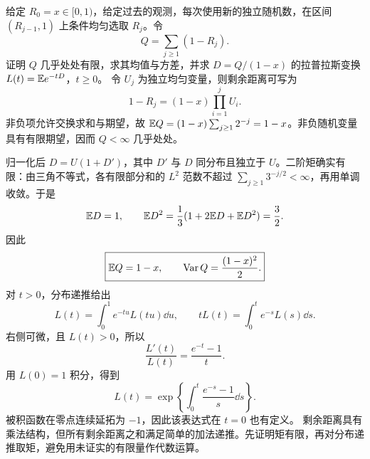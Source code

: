 给定 $R_0=x\in[0,1)$，给定过去的观测，每次使用新的独立随机数，在区间 $(R_{j-1},1)$ 上条件均匀选取 $R_j$。令
\[
Q=\sum_{j\ge1}(1-R_j).
\]
证明 $Q$ 几乎处处有限，求其均值与方差，并求 $D=Q/(1-x)$ 的拉普拉斯变换 $L(t)=\mathbb{E} e^{-tD}$，$t\ge0$。
\solution 令 $U_j$ 为独立均匀变量，则剩余距离可写为
\[
1-R_j=(1-x)\prod_{i=1}^jU_i.
\]
非负项允许交换求和与期望，故 $\mathbb{E} Q=(1-x)\sum_{j\ge1}2^{-j}=1-x$。非负随机变量具有有限期望，因而 $Q<\infty$ 几乎处处。

归一化后 $D=U(1+D')$，其中 $D'$ 与 $D$ 同分布且独立于 $U$。二阶矩确实有限：由三角不等式，各有限部分和的 $L^2$ 范数不超过 $\sum_{j\ge1}3^{-j/2}<\infty$，再用单调收敛。于是
\[
\mathbb{E} D=1,\qquad
\mathbb{E} D^2=\frac13(1+2\mathbb{E} D+\mathbb{E} D^2)=\frac32.
\]
因此
\[
\boxed{\mathbb{E} Q=1-x,\qquad \operatorname{Var} Q=\frac{(1-x)^2}{2}.}
\]
对 $t>0$，分布递推给出
\[
L(t)=\int_0^1e^{-tu}L(tu)\dd u,
\qquad tL(t)=\int_0^te^{-s}L(s)\dd s.
\]
右侧可微，且 $L(t)>0$，所以
\[
\frac{L'(t)}{L(t)}=\frac{e^{-t}-1}{t}.
\]
用 $L(0)=1$ 积分，得到
\[
\boxed{L(t)=\exp\!\left\{\int_0^t\frac{e^{-s}-1}{s}\dd s\right\}.}
\]
被积函数在零点连续延拓为 $-1$，因此该表达式在 $t=0$ 也有定义。
\insight 剩余距离具有乘法结构，但所有剩余距离之和满足简单的加法递推。先证明矩有限，再对分布递推取矩，避免用未证实的有限量作代数运算。
